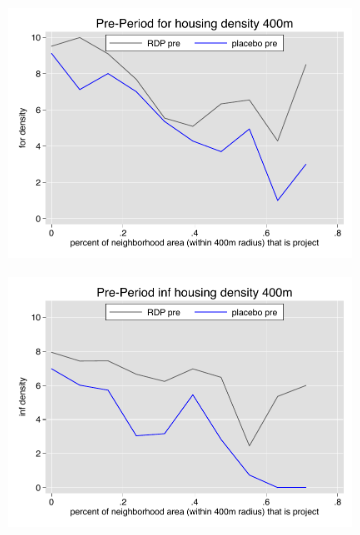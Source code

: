 \documentclass[12pt]{article}
\begin{document}
\pagebreak





\begin{figure}
        \begin{subfigure}[b]{0.495\textwidth}
            \centering
            \includegraphics[width=\textwidth,trim={0.3cm .3cm 0.1cm 0cm}, clip=true]{figures/overlap_for_400_local_pre.pdf}
        \end{subfigure}
        \hfill
        \begin{subfigure}[b]{0.495\textwidth}  
            \centering 
            \includegraphics[width=\textwidth,trim={0.3cm .3cm 0.1cm 0cm}, clip=true]{figures/overlap_inf_400_local_pre.pdf}

\end{subfigure}
\end{figure}
\end{document}

